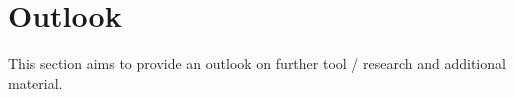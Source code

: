 
\chapter{Outlook}
This section aims to provide an outlook on further tool / research and additional material.
